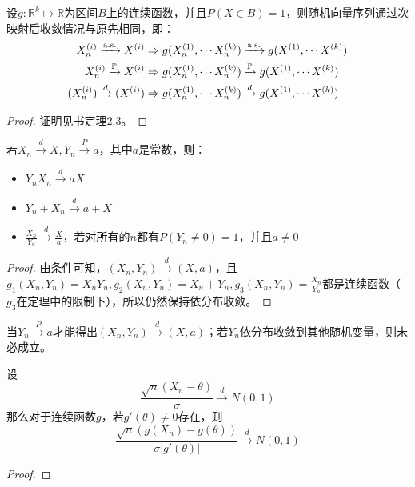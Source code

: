\begin{theorem}[连续映射定理]\label{thm:continuous_mapping}
    设$g: \mathbb{R}^k \mapsto \mathbb{R}$为区间$B$上的\underline{连续}函数，并且$P(X \in B)=1$，则随机向量序列通过次映射后收敛情况与原先相同，即：
    \begin{align*}
        X_n^{(i)} \xrightarrow{\mathrm{a.s.}} X^{(i)}  & \Rightarrow g(X_n^{(1)},\cdots X_n^{(k)}) \xrightarrow{\mathrm{a.s.}} g(X^{(1)},\cdots X^{(k)}) \\
        X_n^{(i)} \xrightarrow{\mathbb{P}} X^{(i)}   & \Rightarrow g(X_n^{(1)},\cdots X_n^{(k)}) \xrightarrow{\mathbb{P}} g(X^{(1)},\cdots X^{(k)})  \\
        (X_n^{(i)}) \xrightarrow{d}(X^{(i)}) & \Rightarrow g(X_n^{(1)},\cdots X_n^{(k)}) \xrightarrow{d} g(X^{(1)},\cdots X^{(k)})   \\
    \end{align*}
\end{theorem}
\begin{proof}
    证明见书\cite[Asymptotic Statistics]{vaart_1998}定理2.3。
\end{proof}

\begin{corollary}[Slutsky定理]\label{thm:Slutsky}
    若$X_n \xrightarrow{d} X, Y_n \xrightarrow{P} a$，其中$a$是常数，则：
    \begin{itemize}
        \item$Y_n X_n \xrightarrow{d} a X$
        \item$Y_n + X_n \xrightarrow{d} a + X$
        \item$\frac{X_n}{Y_n}  \xrightarrow{d} \frac{X}{a}$，若对所有的$n$都有$P(Y_n\neq 0)=1$，并且$a\neq 0$
    \end{itemize}
\end{corollary}
\begin{proof}
    由条件可知，$(X_n,Y_n) \xrightarrow{d}(X,a)$，且$g_1(X_n,Y_n)=X_n Y_n, g_2(X_n,Y_n)=X_n+Y_n, g_3(X_n,Y_n)=\frac{X_n}{Y_n}$都是连续函数（$g_3$在定理中的限制下），所以仍然保持依分布收敛。
\end{proof}
\begin{remark}
    当$Y_n \xrightarrow{P} a$才能得出$(X_n,Y_n) \xrightarrow{d}(X,a)$；若$Y_n$依分布收敛到其他随机变量，则未必成立。
\end{remark}

\begin{theorem}[theta方法的极限定理]
    设
    \[ \frac{\sqrt{n}(X_n-\theta)}{\sigma} \xrightarrow{d} N(0,1) \]
    那么对于连续函数$g$，若$g'(\theta)\neq 0$存在，则
    \[ \frac{\sqrt{n}(g(X_n)-g(\theta))}{\sigma|g'(\theta)|} \xrightarrow{d} N(0,1) \]
\end{theorem}
\begin{proof}
\end{proof}

